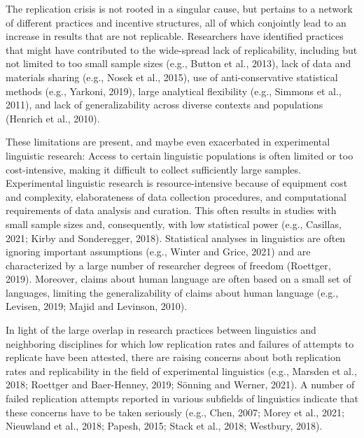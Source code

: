 \documentclass[]{elsarticle} %
\begin{document}
The replication crisis is not rooted in a singular cause, but pertains to a network of different practices and incentive structures, all of which conjointly lead to an increase in results that are not replicable. Researchers have identified practices that might have contributed to the wide-spread lack of replicability, including but not limited to too small sample sizes (e.g., Button et al., 2013), lack of data and materials sharing (e.g., Nosek et al., 2015), use of anti-conservative statistical methods (e.g., Yarkoni, 2019), large analytical flexibility (e.g., Simmons et al., 2011), and lack of generalizability across diverse contexts and populations (Henrich et al., 2010).

These limitations are present, and maybe even exacerbated in experimental linguistic research: Access to certain linguistic populations is often limited or too cost-intensive, making it difficult to collect sufficiently large samples. Experimental linguistic research is resource-intensive because of equipment cost and complexity, elaborateness of data collection procedures, and computational requirements of data analysis and curation. This often results in studies with small sample sizes and, consequently, with low statistical power (e.g., Casillas, 2021; Kirby and Sonderegger, 2018). Statistical analyses in linguistics are often ignoring important assumptions (e.g., Winter and Grice, 2021) and are characterized by a large number of researcher degrees of freedom (Roettger, 2019). Moreover, claims about human language are often based on a small set of languages, limiting the generalizability of claims about human language (e.g., Levisen, 2019; Majid and Levinson, 2010).

In light of the large overlap in research practices between linguistics and neighboring disciplines for which low replication rates and failures of attempts to replicate have been attested, there are raising concerns about both replication rates and replicability in the field of experimental linguistics (e.g., Marsden et al., 2018; Roettger and Baer-Henney, 2019; Sönning and Werner, 2021). A number of failed replication attempts reported in various subfields of linguistics indicate that these concerns have to be taken seriously (e.g., Chen, 2007; Morey et al., 2021; Nieuwland et al., 2018; Papesh, 2015; Stack et al., 2018; Westbury, 2018).
\end{document}
